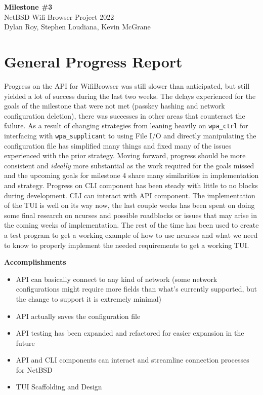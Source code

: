 \documentclass[11pt]{article}
\begin{document}
\begin{center}
  \textbf{\Large Milestone \#3}\\\large NetBSD Wifi Browser Project 2022\\
  Dylan Roy, Stephen Loudiana, Kevin McGrane
\end{center}


\section{General Progress Report}
Progress on the API for WifiBrowser was still slower than anticipated, but still yielded a lot of success
during the last two weeks. The delays experienced for the goals of the milestone that were not met
(passkey hashing and network configuration deletion), there was successes in other areas that counteract
the failure. As a result of changing strategies from leaning heavily on \texttt{wpa\_ctrl} for interfacing
with \texttt{wpa\_supplicant} to using File I/O and directly manipulating the configuration file has
simplified many things and fixed many of the issues experienced with the prior strategy. Moving forward,
progress should be more consistent and \textit{ideally} more substantial as the work required for the goals
missed and the upcoming goals for milestone 4 share many similarities in implementation and strategy.
Progress on CLI component has been steady with little to no blocks during development. CLI can interact 
with API component. The implementation of the TUI is well on its way now, the last couple weeks has been 
spent on doing some final research on ncurses and possible roadblocks or issues that may arise in the coming
weeks of implementation. The rest of the time has been used to create a test program to get a working example
of how to use ncurses and what we need to know to properly implement the needed requirements to get a 
working TUI.

\textbf{Accomplishments}
\begin{itemize}
  \item API can basically connect to any kind of network (some network configurations might require more
    fields than what's currently supported, but the change to support it is extremely minimal)
  \item API actually saves the configuration file
  \item API testing has been expanded and refactored for easier expansion in the future
  \item API and CLI components can interact and streamline connection processes for NetBSD
  \item TUI Scaffolding and Design
\end{itemize}
\end{document}
